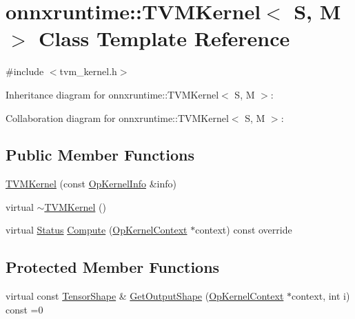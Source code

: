 \hypertarget{classonnxruntime_1_1TVMKernel}{}\section{onnxruntime\+:\+:T\+V\+M\+Kernel$<$ S, M $>$ Class Template Reference}
\label{classonnxruntime_1_1TVMKernel}


{\ttfamily \#include $<$tvm\+\_\+kernel.\+h$>$}



Inheritance diagram for onnxruntime\+:\+:T\+V\+M\+Kernel$<$ S, M $>$\+:


Collaboration diagram for onnxruntime\+:\+:T\+V\+M\+Kernel$<$ S, M $>$\+:
\subsection*{Public Member Functions}
\begin{DoxyCompactItemize}
\item 
\mbox{\hyperlink{classonnxruntime_1_1TVMKernel_a9244e055a706bfabafef7bdefa237c24}{T\+V\+M\+Kernel}} (const \mbox{\hyperlink{classonnxruntime_1_1OpKernelInfo}{Op\+Kernel\+Info}} \&info)
\item 
virtual \mbox{\hyperlink{classonnxruntime_1_1TVMKernel_a5cc8f5923e72ad8d758d4471f1864591}{$\sim$\+T\+V\+M\+Kernel}} ()
\item 
virtual \mbox{\hyperlink{classonnxruntime_1_1common_1_1Status}{Status}} \mbox{\hyperlink{classonnxruntime_1_1TVMKernel_a9cb269c12f0d89742397c71aa1362573}{Compute}} (\mbox{\hyperlink{classonnxruntime_1_1OpKernelContext}{Op\+Kernel\+Context}} $\ast$context) const override
\end{DoxyCompactItemize}
\subsection*{Protected Member Functions}
\begin{DoxyCompactItemize}
\item 
virtual const \mbox{\hyperlink{classonnxruntime_1_1TensorShape}{Tensor\+Shape}} \& \mbox{\hyperlink{classonnxruntime_1_1TVMKernel_abfc9494babe108121334b065a26b8289}{Get\+Output\+Shape}} (\mbox{\hyperlink{classonnxruntime_1_1OpKernelContext}{Op\+Kernel\+Context}} $\ast$context, int i) const =0
\end{DoxyCompactItemize}

